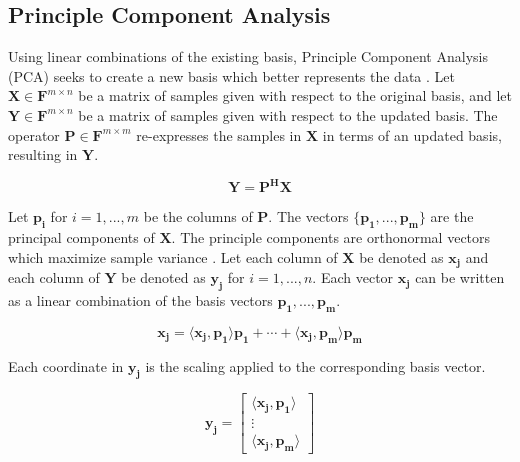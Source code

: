 \documentclass[conference]{IEEEtran}
\begin{document}
    \subsection{Principle Component Analysis} \label{pca_section}
    
    Using linear combinations of the existing basis, Principle Component Analysis (PCA) seeks to create a new basis which better represents the data \cite{shlens_2014_tutorial}. Let $\mathbf{X} \in \mathbf{F}^{m \times n}$ be a matrix of samples given with respect to the original basis, and let $\mathbf{Y} \in \mathbf{F}^{m \times n}$ be a matrix of samples given with respect to the updated basis. The operator $\mathbf{P} \in \mathbf{F}^{m \times m}$ re-expresses the samples in $\mathbf{X}$ in terms of an updated basis, resulting in $\mathbf{Y}$.
    
    \begin{equation}
    		\mathbf{Y} = \mathbf{P^{H}X}
    \end{equation}
    
    Let $\mathbf{p_i}$ for $i = 1,...,m$ be the columns of $\mathbf{P}$. The vectors $\{\mathbf{p_1},...,\mathbf{p_m}\}$ are the principal components of $\mathbf{X}$. The principle components are orthonormal vectors which maximize sample variance \cite{shlens_2014_tutorial}. Let each column of $\mathbf{X}$ be denoted as $\mathbf{x_j}$ and each column of $\mathbf{Y}$ be denoted as $\mathbf{y_j}$ for $i = 1,...,n$. Each vector $\mathbf{x_j}$ can be written as a linear combination of the basis vectors $\mathbf{p_1},...,\mathbf{p_m}$.
    
    \begin{equation}
    		\mathbf{x_j} = \langle \mathbf{x_j}, \mathbf{p_1}\rangle \mathbf{p_1} + \cdots + \langle \mathbf{x_j}, \mathbf{p_m}\rangle \mathbf{p_m}
    	\end{equation}
    	
    	Each coordinate in $\mathbf{y_j}$ is the scaling applied to the corresponding basis vector.
    	
    	\begin{equation}
    		\mathbf{y_j} = \begin{bmatrix}
    			\langle \mathbf{x_j}, \mathbf{p_1} \rangle\\
    			\vdots \\
    			\langle \mathbf{x_j}, \mathbf{p_m}\rangle
    		\end{bmatrix}
    	\end{equation}
    	
\end{document}
